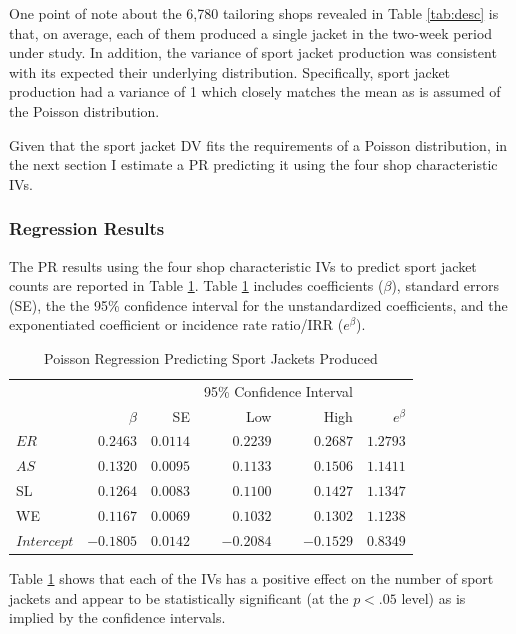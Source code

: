 \documentclass[ShortAfour,times,sageapa]{sagej}
\begin{document}
	One point of note about the 6,780 tailoring shops revealed in Table \ref{tab:desc} is that, on average, each of them produced a single jacket in the two-week period under study.
	In addition, the variance of sport jacket production was consistent with its expected their underlying distribution.
	Specifically, sport jacket production had a variance of 1 which closely matches the mean as is assumed of the Poisson distribution. 
	
	Given that the sport jacket DV fits the requirements of a Poisson distribution, in the next section I estimate a PR predicting it using the four shop characteristic IVs.

		\subsubsection{Regression Results}
		
	The PR results using the four shop characteristic IVs to predict sport jacket counts are reported in Table \ref{tab:poisreg}. 
	Table \ref{tab:poisreg} includes coefficients ($\beta$), standard errors (SE), the the 95\% confidence interval for the unstandardized coefficients, and the exponentiated coefficient or incidence rate ratio/IRR ($e^{\beta}$).
	
	\begin{table}[h!]
		\centering
		\caption{\centering Poisson Regression Predicting Sport Jackets Produced} 
		\begin{tabular}{l|rrrrr}
			\toprule
			\multicolumn{1}{l}{} &  &  & \multicolumn{2}{c}{95\% Confidence Interval} &   \\ 
			\cmidrule(lr){4-5}
			\multicolumn{1}{l}{} & $\beta$ & SE & Low & High & $e^{\beta}$ \\ 
			\midrule
			$ER$ & $0.2463$ & $0.0114$ & $0.2239$ & $0.2687$ & $1.2793$ \\ 
			$AS$ & $0.1320$ & $0.0095$ & $0.1133$ & $0.1506$ & $1.1411$ \\ 
			SL & $0.1264$ & $0.0083$ & $0.1100$ & $0.1427$ & $1.1347$ \\ 
			WE & $0.1167$ & $0.0069$ & $0.1032$ & $0.1302$ &  $1.1238$  \\ 
			$Intercept$ & $-0.1805$ & $0.0142$ & $-0.2084$ & $-0.1529$ & $0.8349$ \\
			\bottomrule
		\end{tabular}
		\label{tab:poisreg}
	\end{table}


	Table \ref{tab:poisreg} shows that each of the IVs has a positive effect on the number of sport jackets and appear to be statistically significant (at the $p < .05$ level) as is implied by the confidence intervals.
	
\end{document}
